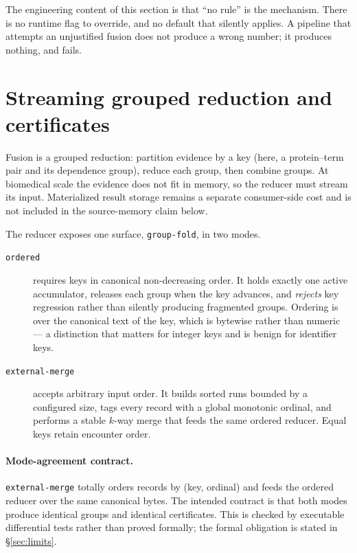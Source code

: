 \documentclass[11pt]{article}
\newcommand{\code}[1]{\texttt{#1}}
\begin{document}
The engineering content of this section is that ``no rule'' is the mechanism.
There is no runtime flag to override, and no default that silently applies. A
pipeline that attempts an unjustified fusion does not produce a wrong number; it
produces nothing, and fails.

\section{Streaming grouped reduction and certificates}\label{sec:reducer}

Fusion is a grouped reduction: partition evidence by a key (here, a
protein--term pair and its dependence group), reduce each group, then combine
groups. At biomedical scale the evidence does not fit in memory, so the reducer
must stream its input. Materialized result storage remains a separate
consumer-side cost and is not included in the source-memory claim below.

The reducer exposes one surface, \code{group-fold}, in two modes.

\begin{description}
  \item[\code{ordered}] requires keys in canonical non-decreasing order. It
    holds exactly one active accumulator, releases each group when the key
    advances, and \emph{rejects} key regression rather than silently producing
    fragmented groups. Ordering is over the canonical text of the key, which is
    bytewise rather than numeric --- a distinction that matters for integer
    keys and is benign for identifier keys.
  \item[\code{external-merge}] accepts arbitrary input order. It builds sorted
    runs bounded by a configured size, tags every record with a global
    monotonic ordinal, and performs a stable $k$-way merge that feeds the same
    ordered reducer. Equal keys retain encounter order.
\end{description}

\paragraph{Mode-agreement contract.}
\code{external-merge} totally orders records by (key, ordinal) and feeds the
ordered reducer over the same canonical bytes. The intended contract is that
both modes produce identical groups and identical certificates. This is checked
by executable differential tests rather than proved formally; the formal
obligation is stated in \S\ref{sec:limits}.
\end{document}
